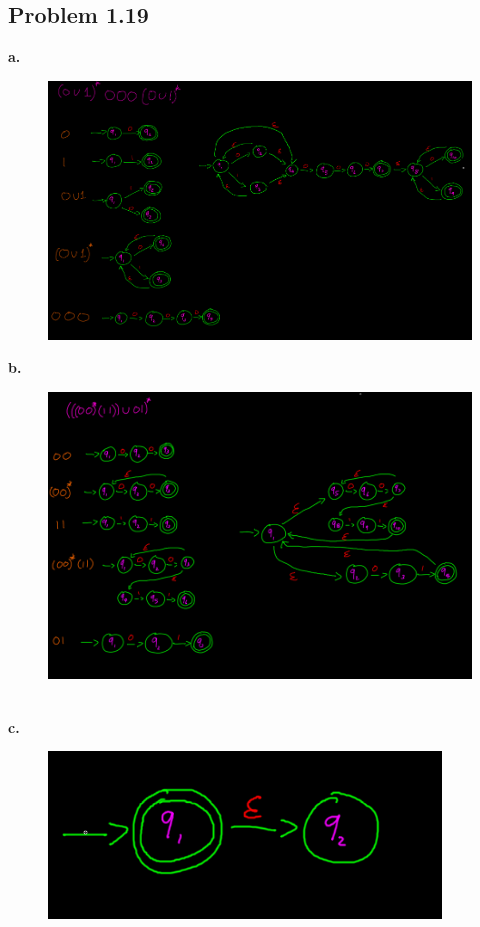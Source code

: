 \documentclass[letter]{article}
\theoremstyle{case}
\begin{document}
\subsection*{Problem 1.19}
\textbf{a. }
\begin{figure}[h!]
	\includegraphics[scale=0.4]{19a.png}
\end{figure}
\newpage
\textbf{b.}
\begin{figure}[h!]
	\includegraphics[scale=0.4]{19b.png}
\end{figure} \\  
\textbf{c. }
\begin{figure}[h!]
	\includegraphics[scale=0.4]{19c.png}
\end{figure}
\end{document}
